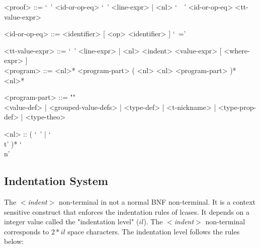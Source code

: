 \documentclass[diploma]{softlab-thesis}
\begin{document}
\begin{grammar}
<proof> ::=
`\ ' <id-or-op-eq> `\ ' <line-expr> |
<nl> `\ \ ' <id-or-op-eq>  <tt-value-expr>

<id-or-op-eq> ::= <identifier> [ <op> <identifier> ] `\ ='

<tt-value-expr> ::=
`\ ' <line-expr> | <nl> <indent> <value-expr> [ <where-expr> ]
\\

<program> ::=
<nl>* <program-part> ( <nl> <nl> <program-part> )* <nl>*

<program-part> ::= ""\\
<value-def> | <grouped-value-defs> | <type-def> | <t-nickname> |
<type-prop-def> | <type-theo>

<nl> :: ( `\ ' | `\\t' )* `\\n'
\end{grammar}

\newpage

\subsection{Indentation System}
\label{subsubsec:indsys}

The \textit{$<$indent$>$} non-terminal in not a normal BNF non-terminal. It is a
context sensitive construct that enforces the indentation rules of lcases.
It depends on a integer value called the "indentation level" ($il$).
The \textit{$<$indent$>$} non-terminal corresponds to $2*il$ space characters.
The indentation level follows the rules below:
\end{document}
